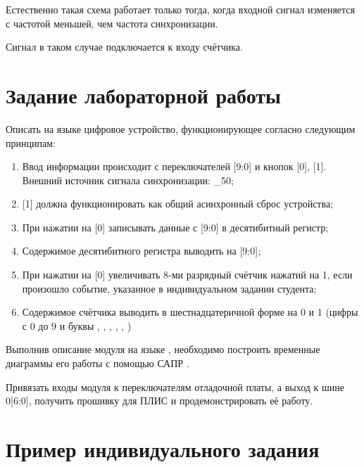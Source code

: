 \par{Естественно такая схема работает только тогда, когда входной сигнал изменяется с частотой меньшей, чем частота синхронизации.}

\par{Сигнал  в таком случае подключается к входу  счётчика.}

\section{Задание лабораторной работы}

\par{Описать на языке  цифровое устройство, функционирующее согласно следующим принципам:
\begin{enumerate}%
  \item Ввод информации происходит с переключателей [9:0] и кнопок [0], [1]. Внешний источник сигнала синхронизации: \_50;
  \item {}[1] должна функционировать как общий асинхронный сброс устройства;
  \item При нажатии на [0] записывать данные с [9:0] в десятибитный регистр;
  \item Содержимое десятибитного регистра выводить на [9:0];
  \item При нажатии на [0] увеличивать 8-ми разрядный счётчик нажатий на 1, если произошло событие, указанное в индивидуальном задании студента;
  \item Содержимое счётчика выводить в шестнадцатеричной форме на 0 и 1 (цифры с 0 до 9 и буквы , , , , , )
\end{enumerate}}

\par{Выполнив описание модуля на языке , необходимо построить временные диаграммы его работы с помощью САПР .}

\par{Привязать входы модуля к переключателям  отладочной платы, а выход к шине 0[6:0], получить прошивку для ПЛИС и продемонстрировать её работу.}

\section{Пример индивидуального задания}

